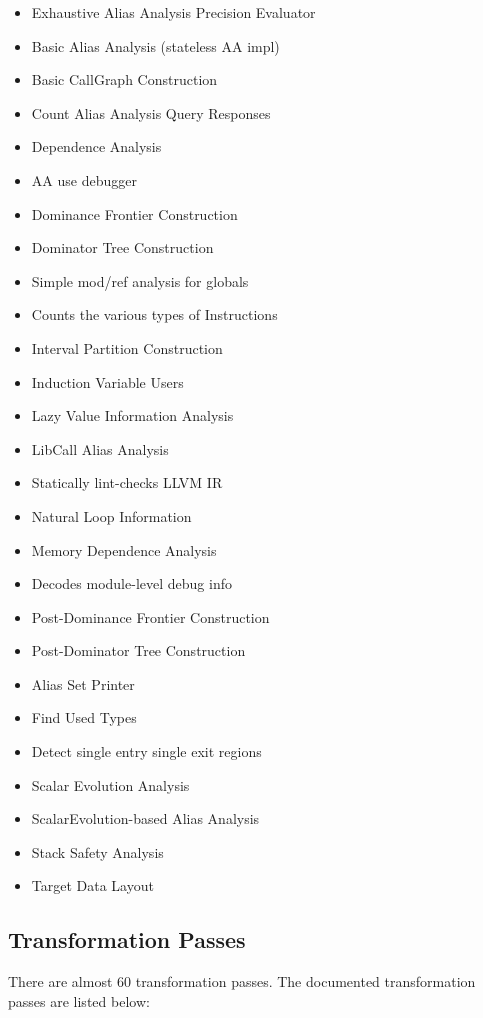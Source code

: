 \begin{multicols}{3}
\begin{itemize}
\scriptsize
     \item Exhaustive Alias Analysis Precision Evaluator
     \item Basic Alias Analysis (stateless AA impl)
     \item Basic CallGraph Construction
     \item Count Alias Analysis Query Responses
     \item Dependence Analysis
     \item AA use debugger
     \item Dominance Frontier Construction
     \item Dominator Tree Construction
     \item Simple mod/ref analysis for globals
     \item Counts the various types of Instructions
     \item Interval Partition Construction
     \item Induction Variable Users
     \item Lazy Value Information Analysis
     \item LibCall Alias Analysis
     \item Statically lint-checks LLVM IR
     \item Natural Loop Information
     \item Memory Dependence Analysis
     \item Decodes module-level debug info
     \item Post-Dominance Frontier Construction
     \item Post-Dominator Tree Construction
     \item Alias Set Printer
     \item Find Used Types
     \item Detect single entry single exit regions
     \item Scalar Evolution Analysis
     \item ScalarEvolution-based Alias Analysis
     \item Stack Safety Analysis
     \item Target Data Layout

\end{itemize}
\end{multicols}


\subsection{Transformation Passes}
There are almost 60 transformation passes. The documented transformation passes are listed below:

